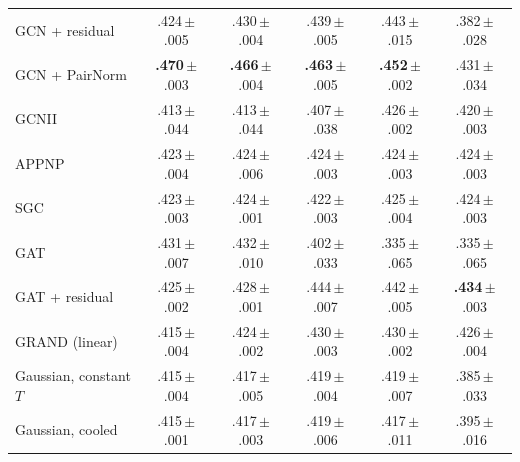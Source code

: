 \begin{tabular}{lccccc}
GCN + residual & .424\,{\tiny$\pm$.005} & .430\,{\tiny$\pm$.004} & .439\,{\tiny$\pm$.005} & .443\,{\tiny$\pm$.015} & .382\,{\tiny$\pm$.028}\\
GCN + PairNorm & \textbf{.470}\,{\tiny$\pm$.003} & \textbf{.466}\,{\tiny$\pm$.004} & \textbf{.463}\,{\tiny$\pm$.005} & \textbf{.452}\,{\tiny$\pm$.002} & .431\,{\tiny$\pm$.034}\\
GCNII & .413\,{\tiny$\pm$.044} & .413\,{\tiny$\pm$.044} & .407\,{\tiny$\pm$.038} & .426\,{\tiny$\pm$.002} & .420\,{\tiny$\pm$.003}\\
APPNP & .423\,{\tiny$\pm$.004} & .424\,{\tiny$\pm$.006} & .424\,{\tiny$\pm$.003} & .424\,{\tiny$\pm$.003} & .424\,{\tiny$\pm$.003}\\
SGC & .423\,{\tiny$\pm$.003} & .424\,{\tiny$\pm$.001} & .422\,{\tiny$\pm$.003} & .425\,{\tiny$\pm$.004} & .424\,{\tiny$\pm$.003}\\
GAT & .431\,{\tiny$\pm$.007} & .432\,{\tiny$\pm$.010} & .402\,{\tiny$\pm$.033} & .335\,{\tiny$\pm$.065} & .335\,{\tiny$\pm$.065}\\
GAT + residual & .425\,{\tiny$\pm$.002} & .428\,{\tiny$\pm$.001} & .444\,{\tiny$\pm$.007} & .442\,{\tiny$\pm$.005} & \textbf{.434}\,{\tiny$\pm$.003}\\
GRAND (linear) & .415\,{\tiny$\pm$.004} & .424\,{\tiny$\pm$.002} & .430\,{\tiny$\pm$.003} & .430\,{\tiny$\pm$.002} & .426\,{\tiny$\pm$.004}\\
Gaussian, constant $T$ & .415\,{\tiny$\pm$.004} & .417\,{\tiny$\pm$.005} & .419\,{\tiny$\pm$.004} & .419\,{\tiny$\pm$.007} & .385\,{\tiny$\pm$.033}\\
Gaussian, cooled & .415\,{\tiny$\pm$.001} & .417\,{\tiny$\pm$.003} & .419\,{\tiny$\pm$.006} & .417\,{\tiny$\pm$.011} & .395\,{\tiny$\pm$.016}\\
\bottomrule
\end{tabular}
